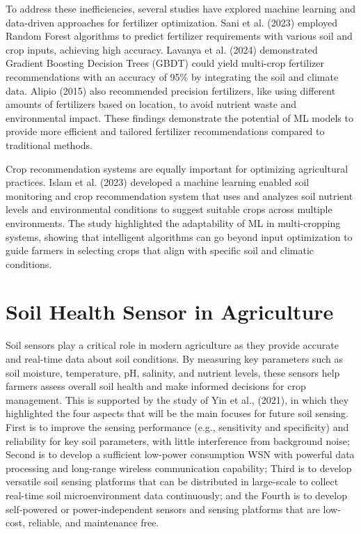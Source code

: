 {To address these inefficiencies, several studies have explored machine learning and data-driven approaches for fertilizer optimization. Sani et al. (2023) employed Random Forest algorithms to predict fertilizer requirements with various soil and crop inputs, achieving high accuracy. Lavanya et al. (2024) demonstrated Gradient Boosting Decision Trees (GBDT) could yield multi-crop fertilizer recommendations with an accuracy of 95\% by integrating the soil and climate data. Alipio (2015) also recommended precision fertilizers, like using different amounts of fertilizers based on location, to avoid nutrient waste and environmental impact. These findings demonstrate the potential of ML models to provide more efficient and tailored fertilizer recommendations compared to traditional methods. 

Crop recommendation systems are equally important for optimizing agricultural practices. Islam et al. (2023) developed a machine learning enabled soil monitoring and crop recommendation system that uses and analyzes soil nutrient levels and environmental conditions to suggest suitable crops across multiple environments. The study highlighted the adaptability of ML in multi-cropping systems, showing that intelligent algorithms can go beyond input optimization to guide farmers in selecting crops that align with specific soil and climatic conditions.

\section{Soil Health Sensor in Agriculture}
Soil sensors play a critical role in modern agriculture as they provide accurate and real-time data about soil conditions. By measuring key parameters such as soil moisture, temperature, pH, salinity, and nutrient levels, these sensors help farmers assess overall soil health and make informed decisions for crop management. This is supported by the study of  Yin et al., (2021), in which they highlighted the four aspects that will be the main focuses for future soil sensing. First is to improve the sensing performance (e.g., sensitivity and specificity) and reliability for key soil parameters, with little interference from background noise;  Second is to develop a sufficient low-power consumption WSN with powerful data processing and long-range wireless communication capability; Third is to develop versatile soil sensing platforms that can be distributed in large-scale to collect real-time soil microenvironment data continuously; and the Fourth is to develop self-powered or power-independent sensors and sensing platforms that are low-cost, reliable, and maintenance free.

}
